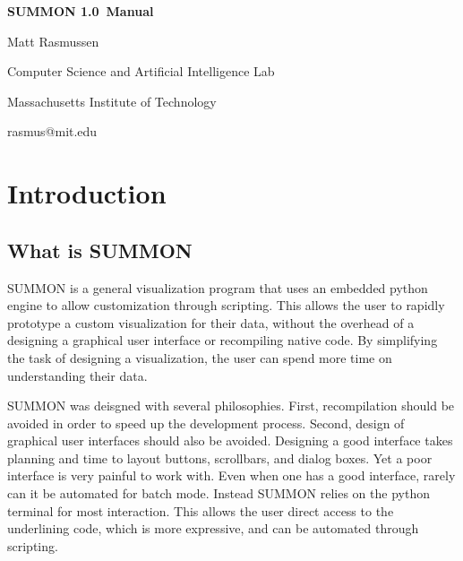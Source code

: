 \documentclass[12pt]{article}
\newcommand{\version}{1.0}
\begin{document}
\begin{titlepage}

\begin{center}

\vspace*{2.5in}

{\huge \bf {}\selectfont 
SUMMON \version\ Manual
}
\vspace*{.5in}

{\large
Matt Rasmussen
}
\vspace*{.5in}

Computer Science and Artificial Intelligence Lab

Massachusetts Institute of Technology

\vspace*{.25in}

rasmus@mit.edu
\end{center}

\end{titlepage}


\tableofcontents

\clearpage

\section{Introduction}
\label{sec:intro}


\subsection{What is SUMMON}

SUMMON is a general visualization program that uses an embedded python engine to
allow customization through scripting.  This allows the user to rapidly
prototype a custom visualization for their data, without the overhead of a
designing a graphical user interface or recompiling native code.  By simplifying
the task of designing a visualization, the user can spend more time on
understanding their data. 

SUMMON was deisgned with several philosophies.  First, recompilation should
be avoided in order to speed up the development process.  Second, design of
graphical user interfaces should also be avoided.  Designing a good interface
takes planning and time to layout buttons, scrollbars, and dialog boxes.  Yet a 
poor interface is very painful to work with. Even when one has a good interface,
rarely can it be automated for batch mode.  Instead SUMMON relies on the
python terminal for most interaction.  This allows the user direct access to the
underlining code, which is more expressive, and can be automated through
scripting.  
\end{document}
